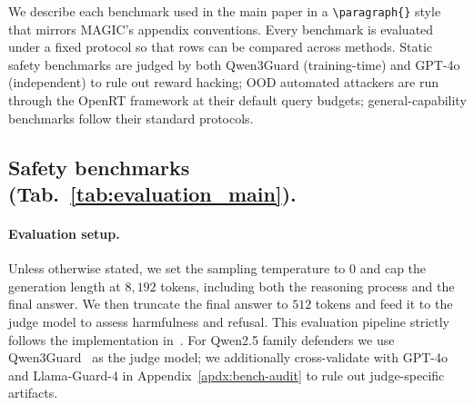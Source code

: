 \documentclass{article}
\begin{document}
We describe each benchmark used in the main paper in a \texttt{\textbackslash paragraph\{\}} style that mirrors MAGIC's appendix conventions. Every benchmark is evaluated under a fixed protocol so that rows can be compared across methods. Static safety benchmarks are judged by both Qwen3Guard (training-time) and GPT-4o (independent) to rule out reward hacking; OOD automated attackers are run through the OpenRT framework at their default query budgets; general-capability benchmarks follow their standard protocols.

\subsection{Safety benchmarks (Tab.~\ref{tab:evaluation_main}).}
\label{apdx:bench-safety}

\paragraph{Evaluation setup.} Unless otherwise stated, we set the sampling temperature to $0$ and cap the generation length at $8{,}192$ tokens, including both the reasoning process and the final answer. We then truncate the final answer to $512$ tokens and feed it to the judge model to assess harmfulness and refusal. This evaluation pipeline strictly follows the implementation in~\citet{liu2025chasing}. For Qwen2.5 family defenders we use Qwen3Guard~\citep{zhao2025qwen3guard} as the judge model; we additionally cross-validate with GPT-4o and Llama-Guard-4 in Appendix~\ref{apdx:bench-audit} to rule out judge-specific artifacts.
\end{document}
